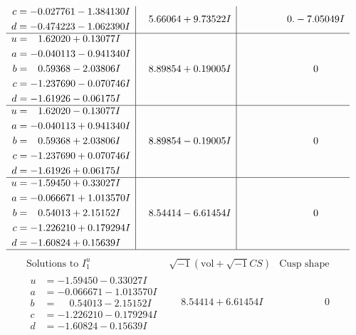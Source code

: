 \documentclass[1p]{elsarticle_modified}
\theoremstyle{definition}
\newcommand{\I}{\sqrt{-1}}
\begin{document}
$$\begin{array}{c|c|c}
\begin{aligned}
c &= -0.027761 - 1.384130 I \\
d &= -0.474223 - 1.062390 I\end{aligned}
 & \phantom{-}5.66064 + 9.73522 I & \phantom{-0.000000 } 0. - 7.05049 I \\ \hline\begin{aligned}
u &= \phantom{-}1.62020 + 0.13077 I \\
a &= -0.040113 - 0.941340 I \\
b &= \phantom{-}0.59368 - 2.03806 I \\
c &= -1.237690 - 0.070746 I \\
d &= -1.61926 - 0.06175 I\end{aligned}
 & \phantom{-}8.89854 + 0.19005 I & \phantom{-0.000000 } 0 \\ \hline\begin{aligned}
u &= \phantom{-}1.62020 - 0.13077 I \\
a &= -0.040113 + 0.941340 I \\
b &= \phantom{-}0.59368 + 2.03806 I \\
c &= -1.237690 + 0.070746 I \\
d &= -1.61926 + 0.06175 I\end{aligned}
 & \phantom{-}8.89854 - 0.19005 I & \phantom{-0.000000 } 0 \\ \hline\begin{aligned}
u &= -1.59450 + 0.33027 I \\
a &= -0.066671 + 1.013570 I \\
b &= \phantom{-}0.54013 + 2.15152 I \\
c &= -1.226210 + 0.179294 I \\
d &= -1.60824 + 0.15639 I\end{aligned}
 & \phantom{-}8.54414 - 6.61454 I & \phantom{-0.000000 } 0\\
 \hline 
 \end{array}$$\newpage$$\begin{array}{c|c|c}  
\text{Solutions to }I^u_{1}& \I (\text{vol} + \sqrt{-1}CS) & \text{Cusp shape}\\
 \hline 
\begin{aligned}
u &= -1.59450 - 0.33027 I \\
a &= -0.066671 - 1.013570 I \\
b &= \phantom{-}0.54013 - 2.15152 I \\
c &= -1.226210 - 0.179294 I \\
d &= -1.60824 - 0.15639 I\end{aligned}
 & \phantom{-}8.54414 + 6.61454 I & \phantom{-0.000000 } 0 \\ \hline\begin{aligned}

\end{aligned}
\end{array}$$
\end{document}
